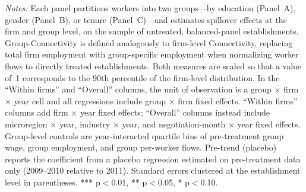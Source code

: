\documentclass[11pt]{article}
\begin{document}
\begin{table}[H]
\begin{minipage}{\linewidth}\vspace{4pt}\scriptsize\textit{Notes:} Each panel partitions workers into two groups---by education (Panel~A), gender (Panel~B), or tenure (Panel~C)---and estimates spillover effects at the firm and group level, on the sample of untreated, balanced-panel establishments. Group-Connectivity is defined analogously to firm-level Connectivity, replacing total firm employment with group-specific employment when normalizing worker flows to directly treated establishments. Both measures are scaled so that a value of~1 corresponds to the 90th percentile of the firm-level distribution. In the ``Within firms'' and ``Overall'' columns, the unit of observation is a group $\times$ firm $\times$ year cell and all regressions include group $\times$ firm fixed effects. ``Within firms'' columns add firm $\times$ year fixed effects; ``Overall'' columns instead include microregion $\times$ year, industry $\times$ year, and negotiation-month $\times$ year fixed effects. Group-level controls are year-interacted quartile bins of pre-treatment group wage, group employment, and group per-worker flows. Pre-trend (placebo) reports the coefficient from a placebo regression estimated on pre-treatment data only (2009--2010 relative to 2011). Standard errors clustered at the establishment level in parentheses. *** p$<$0.01, ** p$<$0.05, * p$<$0.10.\end{minipage}
\end{table}
\end{document}
